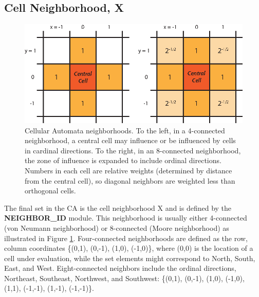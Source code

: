 \documentclass[12pt,letter]{article}
\begin{document}
	\subsection{Cell Neighborhood, X}\label{sec_X}
	
	\begin{figure}[!h]
		\centering
		\includegraphics[width=0.5\linewidth]{figures/neighborhoods}
		\caption{Cellular Automata neighborhoods. To the left, in a 4-connected neighborhood, a central cell may influence or be influenced by cells in cardinal directions. To the right, in an 8-connected neighborhood, the zone of influence is expanded to include ordinal directions. Numbers in each cell are relative weights (determined by distance from the central cell), so diagonal neighbors are weighted less than orthogonal cells.}
		\label{fig_MrRogers}
	\end{figure}
	
		The final set in the CA is the cell neighborhood X and is defined by the \textbf{NEIGHBOR\_ID} module. This neighborhood is usually either 4-connected (von Neumann neighborhood) or 8-connected (Moore neighborhood) as illustrated in Figure \ref{fig_MrRogers}. Four-connected neighborhoods are defined as the row, column coordinates \{(0,1), (0,-1), (1,0), (-1,0)\}, where (0,0) is the location of a cell under evaluation, while the set elements might correspond to North, South, East, and West. Eight-connected neighbors include the ordinal directions, Northeast, Southeast, Northwest, and Southwest: \{(0,1), (0,-1), (1,0), (-1,0), (1,1), (-1,-1), (1,-1), (-1,-1)\}.
		
\end{document}
